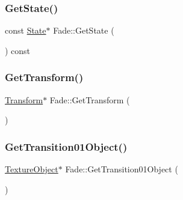 \mbox{\label{class_fade_aeb41dfcadf75dd4c980da68e243cc310}} 
\subsubsection{\texorpdfstring{Get\+State()}{GetState()}}
{\footnotesize\ttfamily const \mbox{\hyperlink{class_fade_ae77826bf3ff2ab95fb7b3b6f95cba80a}{State}}$\ast$ Fade\+::\+Get\+State (\begin{DoxyParamCaption}{ }\end{DoxyParamCaption}) const\hspace{0.3cm}{\ttfamily [inline]}}

\mbox{\label{class_fade_a1a177209e72a27858ceb2d339321e9c4}} 
\subsubsection{\texorpdfstring{Get\+Transform()}{GetTransform()}}
{\footnotesize\ttfamily \mbox{\hyperlink{class_transform}{Transform}}$\ast$ Fade\+::\+Get\+Transform (\begin{DoxyParamCaption}{ }\end{DoxyParamCaption})\hspace{0.3cm}{\ttfamily [inline]}}

\mbox{\label{class_fade_a4e047c532d430095e7d0d70288289a82}} 
\subsubsection{\texorpdfstring{Get\+Transition01\+Object()}{GetTransition01Object()}}
{\footnotesize\ttfamily \mbox{\hyperlink{class_texture_object}{Texture\+Object}}$\ast$ Fade\+::\+Get\+Transition01\+Object (\begin{DoxyParamCaption}{ }\end{DoxyParamCaption})\hspace{0.3cm}{\ttfamily [inline]}}

\mbox{\label{class_fade_aed5a29d39a5fd6161a9aed73d5f30870}} 
